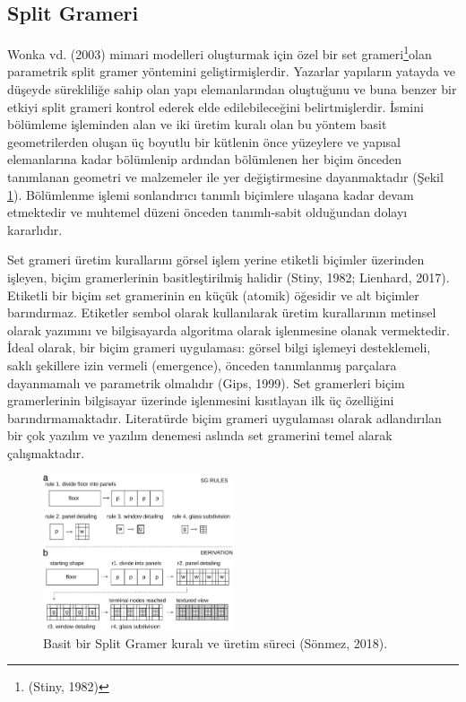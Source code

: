 \documentclass[12pt,turkish,a4paperpaper,]{report}
\begin{document}
\hypertarget{split-grameri}{%
\subsection{Split Grameri}\label{split-grameri}}

Wonka vd. (2003) mimari modelleri oluşturmak için özel bir set
grameri\footnote{(Stiny, 1982)}olan parametrik split gramer yöntemini
geliştirmişlerdir. Yazarlar yapıların yatayda ve düşeyde sürekliliğe
sahip olan yapı elemanlarından oluştuğunu ve buna benzer bir etkiyi
split grameri kontrol ederek elde edilebileceğini belirtmişlerdir.
İsmini bölümleme işleminden alan ve iki üretim kuralı olan bu yöntem
basit geometrilerden oluşan üç boyutlu bir kütlenin önce yüzeylere ve
yapısal elemanlarına kadar bölümlenip ardından bölümlenen her biçim
önceden tanımlanan geometri ve malzemeler ile yer değiştirmesine
dayanmaktadır (Şekil \ref{splitGrammar}). Bölümlenme işlemi sonlandırıcı
tanımlı biçimlere ulaşana kadar devam etmektedir ve muhtemel düzeni
önceden tanımlı-sabit olduğundan dolayı kararlıdır.

Set grameri üretim kurallarını görsel işlem yerine etiketli biçimler
üzerinden işleyen, biçim gramerlerinin basitleştirilmiş halidir (Stiny,
1982; Lienhard, 2017). Etiketli bir biçim set gramerinin en küçük
(atomik) öğesidir ve alt biçimler barındırmaz. Etiketler sembol olarak
kullanılarak üretim kurallarının metinsel olarak yazımını ve
bilgisayarda algoritma olarak işlenmesine olanak vermektedir. İdeal
olarak, bir biçim grameri uygulaması: görsel bilgi işlemeyi
desteklemeli, saklı şekillere izin vermeli (emergence), önceden
tanımlanmış parçalara dayanmamalı ve parametrik olmalıdır (Gips, 1999).
Set gramerleri biçim gramerlerinin bilgisayar üzerinde işlenmesini
kısıtlayan ilk üç özelliğini barındırmamaktadır. Literatürde biçim
grameri uygulaması olarak adlandırılan bir çok yazılım ve yazılım
denemesi aslında set gramerini temel alarak çalışmaktadır.

\begin{figure}
\centering
\includegraphics[width=0.5\textwidth,height=\textheight]{source/figures/splitGrammar.jpg}
\caption{Basit bir Split Gramer kuralı ve üretim süreci (Sönmez, 2018).
\label{splitGrammar}}
\end{figure}
\end{document}
